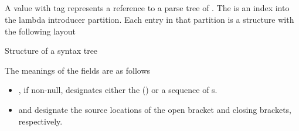 		
		
\subsection{}
\label{sec:ifc:SyntaxSort:LambdaIntroducer}

A  value with tag  represents a reference
to a parse tree of .  The  is an index into the lambda introducer
partition. Each entry in that partition is a structure with the following layout
%
\begin{Structure}
	\caption{Structure of a  syntax tree}
	\label{fig:ifc:SyntaxSort:LambdaIntroducer}
\end{Structure}
%
The meanings of the fields are as follows
\begin{itemize}
	\item {}, if non-null, designates either the 
	() or a sequence of
	s.
	\item {} and  designate the source locations of the open bracket and
	closing brackets, respectively.
\end{itemize}


\subsection{}
\label{sec:ifc:SyntaxSort:LambdaDeclarator}

